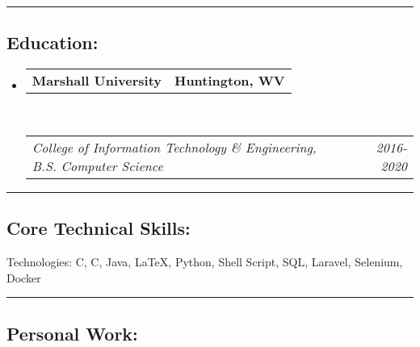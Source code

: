 \documentclass[10pt,letterpaper]{article}
\makeatletter
\newenvironment{indentsection}[1]%
{\begin{list}{}%
	{\setlength{\leftmargin}{#1}}%
	\item[]%
}
{\end{list}}
\newcommand{\headerrow}[2]
{\begin{tabular*}{\linewidth}{l@{\extracolsep{\fill}}r}
	#1 &
	#2 \\
\end{tabular*}}
\newcommand{\CPP}
{C\nolinebreak[4]\hspace{-.05em}\raisebox{.22ex}{\footnotesize\bf ++}}
\makeatother
\begin{document}
\hrule
\vspace{-0.4em}
\subsection*{Education:}

\begin{itemize}
	\parskip=0.1em

	\item 
	\headerrow
		{\textbf{Marshall University}}
		{\textbf{Huntington, WV}}
	\\
	\headerrow
		{\emph{College of Information Technology \& Engineering, B.S. Computer Science}}
		{\emph{2016-2020}}

\end{itemize}


\hrule
\vspace{-0.4em}
\subsection*{Core Technical Skills:}

\begin{indentsection}{\parindent}
\begin{description*}
	\item[Technologies:]
	C, \CPP, Java, \LaTeX, Python, Shell Script, SQL, Laravel, Selenium, Docker
\end{description*}
\end{indentsection}

\hrule
\vspace{-0.4em}
\subsection*{Personal Work:}
\end{document}
